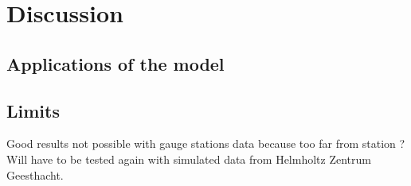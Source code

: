 \chapter{Discussion}

\section{Applications of the model}
\section{Limits}
Good results not possible with gauge stations data because too far from station ? \newline
Will have to be tested again with simulated data from Helmholtz Zentrum Geesthacht.
